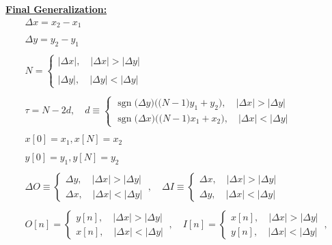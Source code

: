\documentclass{article}
\DeclareMathOperator{\sgn}{sgn}
\begin{document}
\underline{\textbf{Final Generalization:}}
\begin{align*}
    &\Delta x = x_{2} - x_{1} \\ \\
    &\Delta y = y_{2} - y_{1} \\ \\
    &N = \begin{cases}
            |\Delta x|, \quad |\Delta x| > |\Delta y| \\ \\
            |\Delta y|, \quad |\Delta y| < |\Delta y|
           \end{cases} \\ \\  
    &\tau = N - 2d, \quad d \equiv \begin{cases}
                                        \sgn\big(\Delta y\big)\bigg(\big(N - 1\big)y_{1} + y_{2}\bigg), \quad |\Delta x| > |\Delta y| \\  
                                        \sgn\big(\Delta x\big)\bigg(\big(N - 1\big)x_{1} + x_{2}\bigg), \quad |\Delta x| < |\Delta y| 
                                     \end{cases} \\ \\
    &x[0] = x_{1}, x[N] = x_{2} \\ \\
    &y[0] = y_{1}, y[N] = y_{2} \\ \\ 
    &\Delta O \equiv \begin{cases}
                        \Delta y, \quad |\Delta x| > |\Delta y| \\
                        \Delta x, \quad |\Delta x| < |\Delta y| 
                       \end{cases} \ , \quad
     \Delta I \equiv \begin{cases}
                        \Delta x, \quad |\Delta x| > |\Delta y| \\
                        \Delta y, \quad |\Delta x| < |\Delta y| 
                       \end{cases}  \\ \\
    &O[n] = \begin{cases}
                y[n], \quad |\Delta x| > |\Delta y| \\
                x[n], \quad |\Delta x| < |\Delta y|
              \end{cases} \ , \quad
     I[n] = \begin{cases}
                x[n], \quad |\Delta x| > |\Delta y| \\
                y[n], \quad |\Delta x| < |\Delta y| 
              \end{cases} \ , \quad
     \end{align*}
\end{document}
